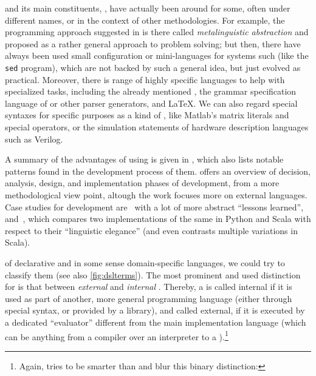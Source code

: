  and its main constituents, \dsls{}, have actually been
around for some, often under different names, or in the context of other methodologies. For example,
the programming approach suggested in \cite{abelson1996:structure} is there called \emph{metalinguistic
  abstraction} and proposed as a rather general approach to problem solving; but then, there have
always been used small configuration or mini-languages for systems such  (like the
\texttt{sed} program), which are not backed by such a general idea, but just evolved as
practical. Moreover, there is range of highly specific languages to help with specialized tasks,
including the already mentioned , the grammar specification language of 
or other parser generators, and \LaTeX. We can also regard special syntaxes for specific purposes as
a kind of \dsl{}, like Matlab's matrix literals and special operators, or the simulation statements
of hardware description languages such as Verilog.

A summary of the advantages of using \dsls{} is given in \cite{spinellis2001:notable}, which also
lists notable patterns found in the development process of them. \cite{mernik2005:dsls} offers an
overview of decision, analysis, design, and implementation phases of \dsl{} development, from a more
methodological view point, altough the work focuses more on external languages. Case studies for
\dsl{} development are~\cite{wile2004:lessons} with a lot of more abstract \enquote{lessons
  learned}, and~\cite{havelund2010:case}, which compares two implementations of the same \dsl{} in
Python and Scala with respect to their \enquote{linguistic elegance} (and even contrasts multiple
variations in Scala).

\label{dsl-definitions}
 of declarative and in some sense domain-specific languages, we
could try to classify them (see also \autoref{fig:dslterms}). The most prominent and used
distinction for \dsls{} is that between \emph{external} and \emph{internal} \dsls{}. Thereby, a
\dsl{} is called internal if it is used as part of another, more general programming language
(either through special syntax, or provided by a library), and called external, if it is executed by
a dedicated \enquote{evaluator} different from the main implementation language (which can be
anything from a compiler over an interpreter to a ).\footnote{Again, 
  tries to be smarter than and blur this binary distinction:
  }

